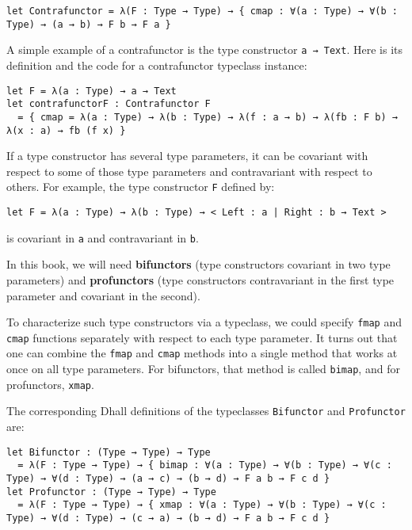 \begin{lstlisting}[language=Dhall]
let Contrafunctor = λ(F : Type → Type) → { cmap : ∀(a : Type) → ∀(b : Type) → (a → b) → F b → F a }
\end{lstlisting}


A simple example of a contrafunctor is the type constructor \lstinline!a → Text!.
Here is its definition and the code for a contrafunctor typeclass instance:


\begin{lstlisting}[language=Dhall]
let F = λ(a : Type) → a → Text
let contrafunctorF : Contrafunctor F
  = { cmap = λ(a : Type) → λ(b : Type) → λ(f : a → b) → λ(fb : F b) → λ(x : a) → fb (f x) } 
\end{lstlisting}


If a type constructor has several type parameters, it can be covariant with respect to some of those type parameters and contravariant with respect to others.
For example, the type constructor \lstinline!F! defined by:


\begin{lstlisting}[language=Dhall]
let F = λ(a : Type) → λ(b : Type) → < Left : a | Right : b → Text >
\end{lstlisting}


is covariant in \lstinline!a! and contravariant in \lstinline!b!.


In this book, we will need \textbf{bifunctors} (type constructors covariant in two type parameters) and \textbf{profunctors} (type constructors contravariant in the first type parameter and covariant in the second).


To characterize such type constructors via a typeclass, we could specify \lstinline!fmap! and \lstinline!cmap! functions separately with respect to each type parameter.
It turns out that one can combine the \lstinline!fmap! and \lstinline!cmap! methods into a single method that works at once on all type parameters.
For bifunctors, that method is called \lstinline!bimap!, and for profunctors, \lstinline!xmap!.


The corresponding Dhall definitions of the typeclasses \lstinline!Bifunctor! and \lstinline!Profunctor! are:


\begin{lstlisting}[language=Dhall]
let Bifunctor : (Type → Type) → Type
  = λ(F : Type → Type) → { bimap : ∀(a : Type) → ∀(b : Type) → ∀(c : Type) → ∀(d : Type) → (a → c) → (b → d) → F a b → F c d }
let Profunctor : (Type → Type) → Type
  = λ(F : Type → Type) → { xmap : ∀(a : Type) → ∀(b : Type) → ∀(c : Type) → ∀(d : Type) → (c → a) → (b → d) → F a b → F c d }
\end{lstlisting}


